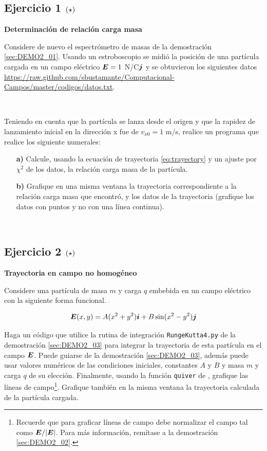 \subsection*{Ejercicio 1 \large{$\left( \star \right)$}}

\textbf{Determinación de relación carga masa}

Considere de nuevo el espectrómetro de masas de la demostración  
\ref{sec:DEMO2_01}. Usando un estroboscopio se midió la posición de una 
partícula cargada en un campo eléctrico $\boldsymbol{ E } = 1$ N/C$\boldsymbol{ j }$ y se 
obtuvieron los siguientes datos 
\url{https://raw.github.com/sbustamante/Computacional-Campos/master/codigos/datos.txt}.

\

Teniendo en cuenta que la partícula se lanza desde el origen y que la rapidez 
de lanzamiento inicial en la dirección x fue de $v_{x0} = 1$ m/s, realice un 
programa que realice los siguiente numerales:

\begin{itemize}
\item[\textbf{a)}] Calcule, usando la ecuación de trayectoria 
\ref{eq:trayectory} y un ajuste por $\chi^2$ de los datos, la relación carga
masa de la partícula.
\item[\textbf{b)}] Grafique en una misma ventana la trayectoria correspondiente
a la relación carga masa que encontró, y los datos de la trayectoria (grafique 
los datos con puntos y no con una línea continua).
\end{itemize}

\

\subsection*{Ejercicio 2 \large{$\left( \star \right)$}}

\textbf{Trayectoria en campo no homogéneo}

Considere una partícula de masa $m$ y carga $q$ embebida en un campo 
eléctrico con la siguiente forma funcional.

\[ \boldsymbol{ E }(x, y) = A(x^2+y^2)\boldsymbol{ i } + B\sin(x^2-y^2)\boldsymbol{ j } \]

Haga un código que utilice la rutina de integración \texttt{RungeKutta4.py} 
de la demostración \ref{sec:DEMO2_03} para integrar la trayectoria de esta 
partícula en el campo $\boldsymbol{ E }$. Puede guiarse de la demostración 
\ref{sec:DEMO2_03}, además puede usar valores numéricos de las condiciones 
iniciales, constantes $A$ y $B$ y masa $m$ y carga $q$ de su elección.
Finalmente, usando la función \texttt{quiver} de \matplotlib, grafique 
las líneas de campo\footnote{Recuerde que para graficar líneas de campo
debe normalizar el campo tal como $\boldsymbol{ E }/|\boldsymbol{ E }|$. Para más información,
remítase a la demostración \ref{sec:DEMO2_02}.}. Grafique también en la 
misma ventana la trayectoria calculada de la partícula cargada.


